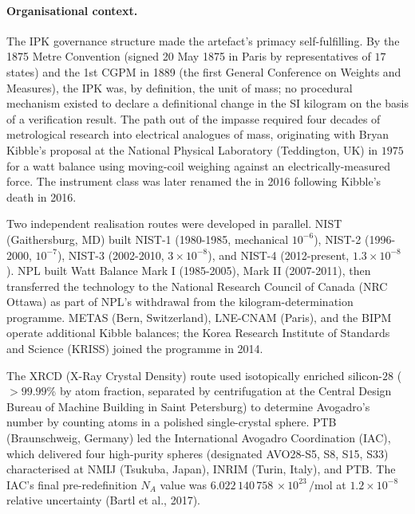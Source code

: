 \paragraph{Organisational context.}
The IPK governance structure made the artefact's primacy
self-fulfilling. By the 1875 Metre Convention (signed 20 May
1875 in Paris by representatives of $17$ states) and the
1st CGPM in 1889 (the first General Conference on Weights and
Measures), the IPK was, by definition, the unit of mass; no
procedural mechanism existed to declare a definitional change in
the SI kilogram on the basis of a verification result. The path
out of the impasse required four decades of metrological
research into electrical analogues of mass, originating with
Bryan Kibble's proposal at the National Physical Laboratory
(Teddington, UK) in $1975$ for a watt balance using moving-coil
weighing against an electrically-measured force. The instrument
class was later renamed the  in 2016
following Kibble's death in 2016.

Two independent realisation routes were developed in parallel.
NIST (Gaithersburg, MD) built NIST-1 (1980-1985, mechanical
$10^{-6}$), NIST-2 (1996-2000, $10^{-7}$), NIST-3 (2002-2010,
$3 \times 10^{-8}$), and NIST-4 (2012-present, $1.3 \times
10^{-8}$). NPL built Watt Balance Mark I (1985-2005), Mark II
(2007-2011), then transferred the technology to the National
Research Council of Canada (NRC Ottawa) as part of NPL's withdrawal
from the kilogram-determination programme. METAS (Bern,
Switzerland), LNE-CNAM (Paris), and the BIPM operate additional
Kibble balances; the Korea Research Institute of Standards and
Science (KRISS) joined the programme in 2014.

The XRCD (X-Ray Crystal Density) route used isotopically
enriched silicon-$28$ ($> 99.99$\% by atom fraction, separated
by centrifugation at the Central Design Bureau of Machine
Building in Saint Petersburg) to determine Avogadro's number by
counting atoms in a polished single-crystal sphere. PTB
(Braunschweig, Germany) led the International Avogadro
Coordination (IAC), which delivered four high-purity spheres
(designated AVO28-S5, S8, S15, S33) characterised at NMIJ
(Tsukuba, Japan), INRIM (Turin, Italy), and PTB. The IAC's
final pre-redefinition $N_{A}$ value was $6.022\,140\,758\,
\times 10^{23}\,\si{\per\mol}$ at $1.2 \times 10^{-8}$ relative
uncertainty (Bartl et al., 2017).

